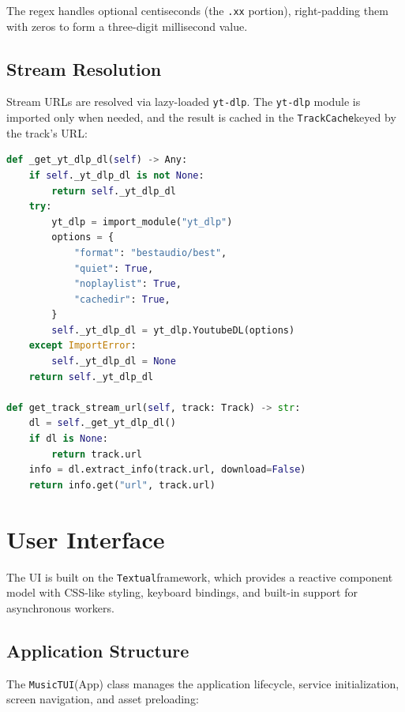 \documentclass[a4paper,11pt,twoside]{article}
\newcommand{\textual}{\texttt{Textual}}
\newcommand{\ytdlp}{\texttt{yt-dlp}}
\newcommand{\musictui}{\texttt{MusicTUI}}
\newcommand{\trackcache}{\texttt{TrackCache}}
\begin{document}
The regex handles optional centiseconds (the \texttt{.xx} portion),
right-padding them with zeros to form a three-digit millisecond value.

\subsection{Stream Resolution}

Stream URLs are resolved via lazy-loaded \ytdlp \cite{ytdlp}. The
\texttt{yt-dlp} module is imported only when needed, and the result is
cached in the \trackcache keyed by the track's URL:

\begin{lstlisting}[language=Python, caption={Lazy yt-dlp stream resolution.}]
def _get_yt_dlp_dl(self) -> Any:
    if self._yt_dlp_dl is not None:
        return self._yt_dlp_dl
    try:
        yt_dlp = import_module("yt_dlp")
        options = {
            "format": "bestaudio/best",
            "quiet": True,
            "noplaylist": True,
            "cachedir": True,
        }
        self._yt_dlp_dl = yt_dlp.YoutubeDL(options)
    except ImportError:
        self._yt_dlp_dl = None
    return self._yt_dlp_dl

def get_track_stream_url(self, track: Track) -> str:
    dl = self._get_yt_dlp_dl()
    if dl is None:
        return track.url
    info = dl.extract_info(track.url, download=False)
    return info.get("url", track.url)
\end{lstlisting}

\section{User Interface}

The UI is built on the \textual framework, which provides a reactive component
model with CSS-like styling, keyboard bindings, and built-in support for
asynchronous workers.

\subsection{Application Structure}

The \musictui(App) class manages the application lifecycle, service
initialization, screen navigation, and asset preloading:
\end{document}
